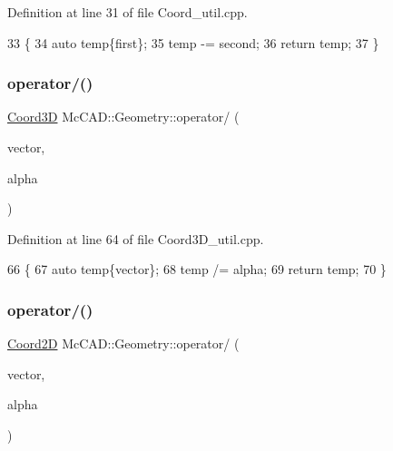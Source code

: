 Definition at line 31 of file Coord\+\_\+util.\+cpp.


\begin{DoxyCode}
33                             \{
34     \textcolor{keyword}{auto} temp\{first\};
35     temp -= second;
36     \textcolor{keywordflow}{return} temp;
37 \}
\end{DoxyCode}
\mbox{\label{namespaceMcCAD_1_1Geometry_add6875e4503620be3ec48e2037978b2f}} 
\subsubsection{\texorpdfstring{operator/()}{operator/()}\hspace{0.1cm}{\footnotesize\ttfamily [1/4]}}
{\footnotesize\ttfamily \hyperlink{classMcCAD_1_1Geometry_1_1Coord3D}{Coord3D} Mc\+C\+A\+D\+::\+Geometry\+::operator/ (\begin{DoxyParamCaption}\item[{const \hyperlink{classMcCAD_1_1Geometry_1_1Coord3D}{Coord3D} \&}]{vector,  }\item[{const \hyperlink{namespaceMcCAD_1_1Geometry_ac043b37a4a7e849fca22869e1982d2f8}{coord\+\_\+type} \&}]{alpha }\end{DoxyParamCaption})}



Definition at line 64 of file Coord3\+D\+\_\+util.\+cpp.


\begin{DoxyCode}
66                                 \{
67     \textcolor{keyword}{auto} temp\{vector\};
68     temp /= alpha;
69     \textcolor{keywordflow}{return} temp;
70 \}
\end{DoxyCode}
\mbox{\label{namespaceMcCAD_1_1Geometry_a28cd2cc1d0220de2e29ea0439e6dee22}} 
\subsubsection{\texorpdfstring{operator/()}{operator/()}\hspace{0.1cm}{\footnotesize\ttfamily [2/4]}}
{\footnotesize\ttfamily \hyperlink{classMcCAD_1_1Geometry_1_1Coord2D}{Coord2D} Mc\+C\+A\+D\+::\+Geometry\+::operator/ (\begin{DoxyParamCaption}\item[{const \hyperlink{classMcCAD_1_1Geometry_1_1Coord2D}{Coord2D} \&}]{vector,  }\item[{const \hyperlink{namespaceMcCAD_1_1Geometry_ac043b37a4a7e849fca22869e1982d2f8}{coord\+\_\+type} \&}]{alpha }\end{DoxyParamCaption})}



